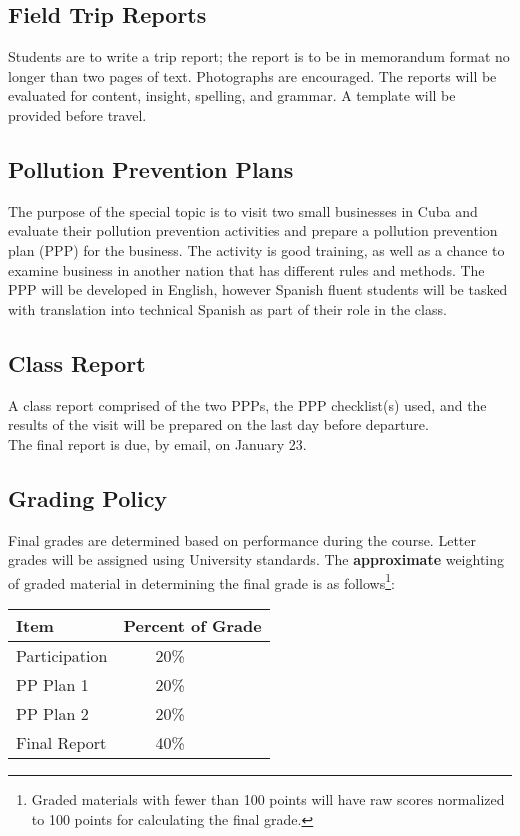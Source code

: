 \documentclass[12pt]{article}
\begin{document}
\subsection*{Field Trip Reports}
Students are to write a trip report;  the report is to be in memorandum format no longer than two pages of text.  Photographs are encouraged.   The reports will be evaluated for content, insight, spelling, and grammar.    A template will be provided before travel.
\subsection*{Pollution Prevention Plans}
The purpose of the special topic is to visit two small businesses in Cuba and evaluate their pollution prevention activities and prepare a pollution prevention plan (PPP) for the business.  The activity is good training, as well as a chance to examine business in another nation that has different rules and methods.   The PPP will be developed in English, however Spanish fluent students will be tasked with translation into technical Spanish as part of their role in the class.
\subsection*{Class Report}
A class report comprised of the two PPPs, the PPP checklist(s) used, and the results of the visit will be prepared on the last day before departure.\\
The final report is due, by email, on January 23.   %
\subsection*{Grading Policy}
Final grades are determined based on performance during the course.
Letter grades will be assigned using University standards.  
The \textbf{approximate} weighting of graded material in determining the final grade is as follows\footnote{Graded materials with fewer than 100 points will have raw scores normalized to 100 points for calculating the final grade.}:

\begin{table}[h!]
   \centering
   \begin{tabular}{l l}
Item & Percent of Grade \\
\hline
\hline
Participation      & ~~~~20\% \\
PP Plan 1        &  ~~~~20\% \\
PP Plan 2  & ~~~~20\% \\
Final Report  & ~~~~40\% \\
\hline
\end{tabular}
\end{table}
\clearpage
\end{document}

